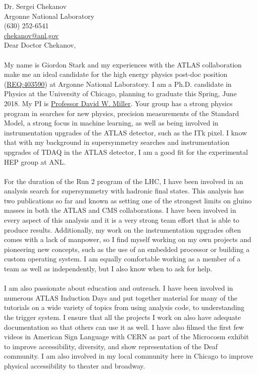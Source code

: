 \documentclass[11pt,letter]{article}
\begin{document}
\thispagestyle{fancy}

Dr. Sergei Chekanov \\
Argonne National Laboratory \\
(630) 252-6541 \\
\href{mailto:chekanov@anl.gov}{chekanov@anl.gov}\\[0.5cm]

Dear Doctor Chekanov, \\
\\
My name is Giordon Stark and my experiences with the ATLAS collaboration make me an ideal candidate for the high energy physics post-doc position (\href{http://inspirehep.net/record/1649919}{REQ:403590}) at Argonne National Laboratory. I am a Ph.D. candidate in Physics at the University of Chicago, planning to graduate this Spring, June 2018. My PI is \href{http://hep.uchicago.edu/~DavidMiller/Welcome.html}{Professor David W. Miller}. Your group has a strong physics program in searches for new physics, precision measurements of the Standard Model, a strong focus in machine learning, as well as being involved in instrumentation upgrades of the ATLAS detector, such as the ITk pixel. I know that with my background in supersymmetry searches and instrumentation upgrades of TDAQ in the ATLAS detector, I am a good fit for the experimental HEP group at ANL.\\
\\
For the duration of the Run 2 program of the LHC, I have been involved in an analysis search for supersymmetry with hadronic final states. This analysis has two publications so far and known as setting one of the strongest limits on gluino masses in both the ATLAS and CMS collaborations. I have been involved in every aspect of this analysis and it is a very strong team effort that is able to produce results. Additionally, my work on the instrumentation upgrades often comes with a lack of manpower, so I find myself working on my own projects and pioneering new concepts, such as the use of an embedded processor or building a custom operating system. I am equally comfortable working as a member of a team as well as independently, but I also know when to ask for help.\\
\\
I am also passionate about education and outreach. I have been involved in numerous ATLAS Induction Days and put together material for many of the tutorials on a wide variety of topics from using analysis code, to understanding the trigger system. I ensure that all the projects I work on also have adequate documentation so that others can use it as well. I have also filmed the first few videos in American Sign Language with CERN as part of the Microcosm exhibit to improve accessibility, diversity, and show representation of the Deaf community. I am also involved in my local community here in Chicago to improve physical accessibility to theater and broadway. \\
\end{document}
